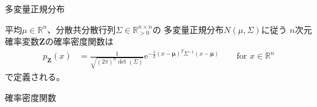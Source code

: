 \documentclass[lualatex,handout]{beamer}
\theoremstyle{definition}
\begin{document}
\begin{frame}{多変量正規分布}
\begin{definition}[多変量正規分布]
平均$\mu\in\mathbb{R}^n$、分散共分散行列$\Sigma\in\mathbb{R}^{n\times n}_{>0}$の
多変量正規分布$N(\mu,\Sigma)$に従う $n$次元確率変数$\symbf{Z}$の確率密度関数は
\begin{align*}
p_{\symbf{Z}}(x) &= \frac1{\sqrt{(2\pi)^n\det(\Sigma)}} \mathrm{e}^{-\frac12 (x-\symbf{\mu})^T\Sigma^{-1} (x-\symbf{\mu})}
\qquad \text{for }x\in\mathbb{R}^n
\end{align*}
で定義される。
\end{definition}
\end{frame}
\begin{frame}{確率密度関数}
\end{frame}
\end{document}
